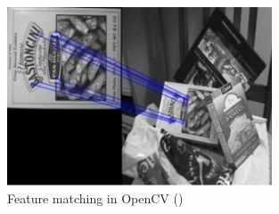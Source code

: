 \documentclass{article}
\newcommand{\goodcite}[1]{ {(\cite{#1})}}
\begin{document}
\begin{figure}[H]
    \centering
    \includegraphics[width=0.7\textwidth]{img/featurematch.png}
    \caption{Feature matching in OpenCV\goodcite{OpenCV}}
    \label{fig:feature_matching}
\end{figure}

\end{document}
